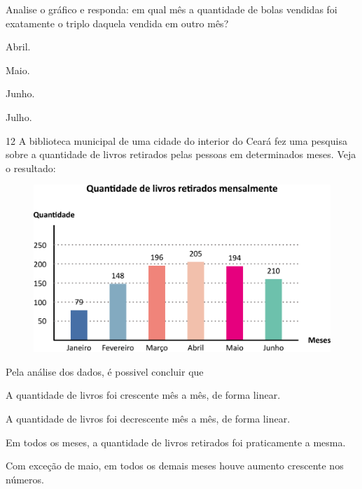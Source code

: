 Analise o gráfico e responda: em qual mês a quantidade de bolas vendidas foi exatamente o triplo daquela vendida em outro mês?

\begin{escolha}
\item
  Abril.
\item
  Maio.
\item
  Junho.
\item
  Julho.
\end{escolha}

\pagebreak

\num{12} A biblioteca municipal de uma cidade do interior do Ceará fez uma pesquisa sobre a quantidade de livros retirados pelas pessoas em determinados meses. Veja o resultado:

\begin{figure}[htpb!]
\centering
\includegraphics[width=\textwidth]{./media/image106.png}
\end{figure}

Pela análise dos dados, é possivel concluir que

\begin{escolha}
\item
  A quantidade de livros foi crescente mês a mês, de forma linear.
\item
  A quantidade de livros foi decrescente mês a mês, de forma linear.
\item
  Em todos os meses, a quantidade de livros retirados foi praticamente a mesma.
\item
  Com exceção de maio, em todos os demais meses houve aumento crescente nos números.
\end{escolha}

\pagebreak

